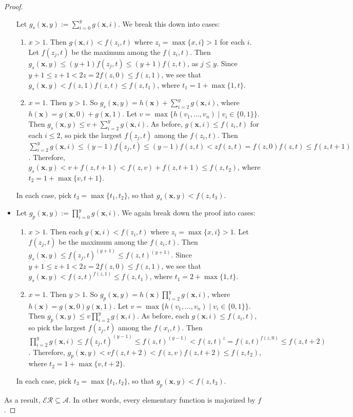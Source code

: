 \documentclass[12pt]{article}
\begin{document}
\begin{proof}
\begin{itemize}
Let $g_s(\boldsymbol{x},y):=\sum_{i=0}^y g(\boldsymbol{x},i)$.  We break this down into cases:
\begin{enumerate}
\item $x>1$.  Then $g(\boldsymbol{x},i)< f(z_i,t)$ where $z_i = \max\lbrace x,i\rbrace>1$ for each $i$.  Let $f(z_j,t)$ be the maximum among the $f(z_i,t)$.  Then $g_s(\boldsymbol{x},y) \le (y+1)f(z_j,t) \le (y+1)f(z,t)$, as $j\le y$.  Since $y+1 \le z+1 < 2z = 2 f(z,0) \le f(z,1)$, we see that $g_s(\boldsymbol{x},y) < f(z,1)f(z,t) \le f(z,t_1)$, where $t_1=1+\max \lbrace 1,t\rbrace$.
\item $x=1$.  Then $y>1$.  So $g_s(\boldsymbol{x},y)=h(\boldsymbol{x})+\sum_{i=2}^y g(\boldsymbol{x},i)$, where $h(\boldsymbol{x})=g(\boldsymbol{x},0)+g(\boldsymbol{x},1)$.  Let $v= \max \lbrace h(v_1,\ldots, v_n) \mid v_i\in \lbrace 0,1\rbrace \rbrace$.  Then $g_s(\boldsymbol{x},y) \le v+ \sum_{i=2}^y g(\boldsymbol{x},i)$.  As before, $g(\boldsymbol{x},i) \le f(z_i,t)$ for each $i\le 2$, so pick the largest $f(z_j,t)$ among the $f(z_i,t)$.  Then $\sum_{i=2}^y g(\boldsymbol{x},i) \le (y-1)f(z_j,t) \le (y-1)f(z,t) < zf(z,t)=f(z,0)f(z,t) \le f(z,t+1)$.  Therefore, $g_s(\boldsymbol{x},y) < v+f(z,t+1) < f(z,v)+f(z,t+1) \le f(z,t_2)$, where $t_2=1+ \max\lbrace v,t+1\rbrace$.
\end{enumerate}
In each case, pick $t_3 = \max\lbrace t_1,t_2\rbrace$, so that $g_s(\boldsymbol{x},y)< f(z,t_3)$.
\item Let $g_p(\boldsymbol{x},y):=\prod_{i=0}^y g(\boldsymbol{x},i)$.  We again break down the proof into cases:
\begin{enumerate}
\item $x>1$.  Then each $g(\boldsymbol{x},i)< f(z_i,t)$ where $z_i = \max\lbrace x,i\rbrace>1$.  Let $f(z_j,t)$ be the maximum among the $f(z_i,t)$.  Then $g_s(\boldsymbol{x},y) \le f(z_j,t)^{(y+1)} \le f(z,t)^{(y+1)}$.  Since $y+1 \le z+1 < 2z = 2 f(z,0) \le f(z,1)$, we see that $g_s(\boldsymbol{x},y) < f(z,t)^{f(z,1)} \le f(z,t_1)$, where $t_1=2+\max \lbrace 1,t\rbrace$.
\item $x=1$.  Then $y>1$.  So $g_p(\boldsymbol{x},y)=h(\boldsymbol{x})\prod_{i=2}^y g(\boldsymbol{x},i)$, where $h(\boldsymbol{x})=g(\boldsymbol{x},0)g(\boldsymbol{x},1)$.  Let $v= \max \lbrace h(v_1,\ldots, v_n) \mid v_i\in \lbrace 0,1\rbrace \rbrace$.  Then $g_p(\boldsymbol{x},y) \le v \prod_{i=2}^y g(\boldsymbol{x},i)$.  As before, each $g(\boldsymbol{x},i) \le f(z_i,t)$, so pick the largest $f(z_j,t)$ among the $f(x_i,t)$.  Then $\prod_{i=2}^y g(\boldsymbol{x},i) \le f(z_j,t)^{(y-1)} \le f(z,t)^{(y-1)} < f(z,t)^z =f(z,t)^{f(z,0)} \le f(z,t+2)$.  Therefore, $g_p(\boldsymbol{x},y) < v f(z,t+2) < f(z,v)f(z,t+2) \le f(z,t_2)$, where $t_2=1+ \max\lbrace v,t+2\rbrace$.
\end{enumerate}
In each case, pick $t_3 = \max\lbrace t_1,t_2\rbrace$, so that $g_p(\boldsymbol{x},y)< f(z,t_3)$.
\end{itemize}
As a result, $\mathcal{ER}\subseteq \mathcal{A}$.  In other words, every elementary function is majorized by $f$.
\end{proof}
\end{document}
